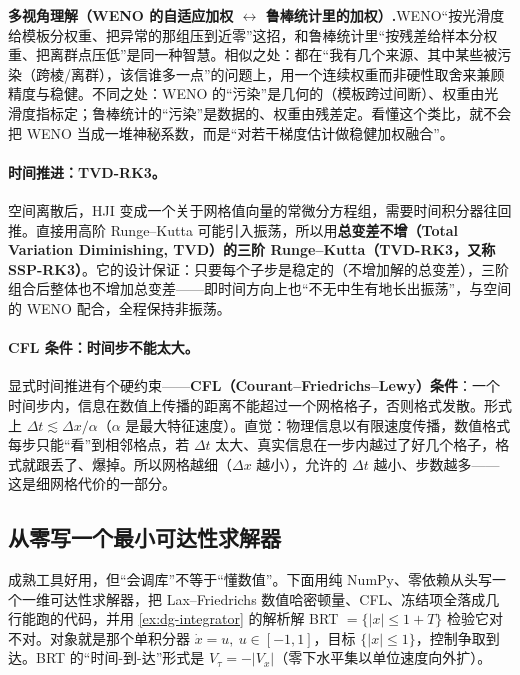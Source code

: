 \begin{note}
\textbf{多视角理解（WENO 的自适应加权 $\leftrightarrow$ 鲁棒统计里的加权）.}\;WENO“按光滑度给模板分权重、把异常的那组压到近零”这招，和鲁棒统计里“按残差给样本分权重、把离群点压低”是同一种智慧。相似之处：都在“我有几个来源、其中某些被污染（跨棱/离群），该信谁多一点”的问题上，用一个连续权重而非硬性取舍来兼顾精度与稳健。不同之处：WENO 的“污染”是几何的（模板跨过间断）、权重由光滑度指标定；鲁棒统计的“污染”是数据的、权重由残差定。看懂这个类比，就不会把 WENO 当成一堆神秘系数，而是“对若干梯度估计做稳健加权融合”。
\end{note}

\paragraph{时间推进：TVD-RK3。}
空间离散后，HJI 变成一个关于网格值向量的常微分方程组，需要时间积分器往回推。直接用高阶 Runge--Kutta 可能引入振荡，所以用\textbf{总变差不增（Total Variation Diminishing, TVD）的三阶 Runge--Kutta（TVD-RK3，又称 SSP-RK3）}。它的设计保证：只要每个子步是稳定的（不增加解的总变差），三阶组合后整体也不增加总变差——即时间方向上也“不无中生有地长出振荡”，与空间的 WENO 配合，全程保持非振荡。

\paragraph{CFL 条件：时间步不能太大。}
显式时间推进有个硬约束——\textbf{CFL（Courant--Friedrichs--Lewy）条件}：一个时间步内，信息在数值上传播的距离不能超过一个网格格子，否则格式发散。形式上 $\Delta t\lesssim\Delta x/\alpha$（$\alpha$ 是最大特征速度）。直觉：物理信息以有限速度传播，数值格式每步只能“看”到相邻格点，若 $\Delta t$ 太大、真实信息在一步内越过了好几个格子，格式就跟丢了、爆掉。所以网格越细（$\Delta x$ 越小），允许的 $\Delta t$ 越小、步数越多——这是细网格代价的一部分。

\subsection{从零写一个最小可达性求解器}
\label{sec:dg-mincode}
成熟工具好用，但“会调库”不等于“懂数值”。下面用纯 NumPy、零依赖从头写一个一维可达性求解器，把 Lax--Friedrichs 数值哈密顿量、CFL、冻结项全落成几行能跑的代码，并用 \cref{ex:dg-integrator} 的解析解 BRT $=\{|x|\le1+T\}$ 检验它对不对。对象就是那个单积分器 $\dot x=u,\ u\in[-1,1]$，目标 $\{|x|\le1\}$，控制争取到达。BRT 的“时间-到-达”形式是 $V_\tau=-|V_x|$（零下水平集以单位速度向外扩）。

